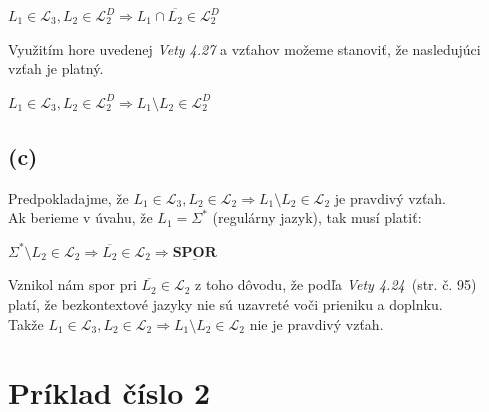 \documentclass[11pt,a4paper]{article}
\begin{document}
\begin{center}
$L_1 \in \mathcal{L}_3, L_2 \in \mathcal{L}_2^D \Rightarrow L_1 \cap \overline{L_2} \in \mathcal{L}_2^D$
\end{center}

Využitím hore uvedenej \textit{Vety 4.27} a vzťahov možeme stanoviť, že nasledujúci vzťah je platný.

\begin{center}
$L_1 \in \mathcal{L}_3, L_2 \in \mathcal{L}_2^D \Rightarrow L_1 \setminus L_2 \in \mathcal{L}_2^D$
\end{center}



\subsection{(c)} %

Predpokladajme, že $L_1 \in \mathcal{L}_3, L_2 \in \mathcal{L}_2 \Rightarrow L_1 \setminus L_2 \in \mathcal{L}_2$ je pravdivý vzťah.\\

Ak berieme v úvahu, že $L_1 = \Sigma^*$ (regulárny jazyk), tak musí platiť:
\begin{center}
$\Sigma^* \setminus L_2 \in \mathcal{L}_2 \Rightarrow \overline{L_2} \in \mathcal{L}_2 \Rightarrow \underline{\textbf{SPOR}}$
\end{center}

Vznikol nám spor pri $\overline{L_2} \in \mathcal{L}_2$ z toho dôvodu, že podľa \textit{Vety 4.24}~\cite{TIN}(str. č. 95) platí, že bezkontextové jazyky nie sú uzavreté voči prieniku a doplnku.\\

Takže $L_1 \in \mathcal{L}_3, L_2 \in \mathcal{L}_2 \Rightarrow L_1 \setminus L_2 \in \mathcal{L}_2$ nie je pravdivý vzťah.




\newpage
\section{Príklad číslo 2} %
\end{document}
